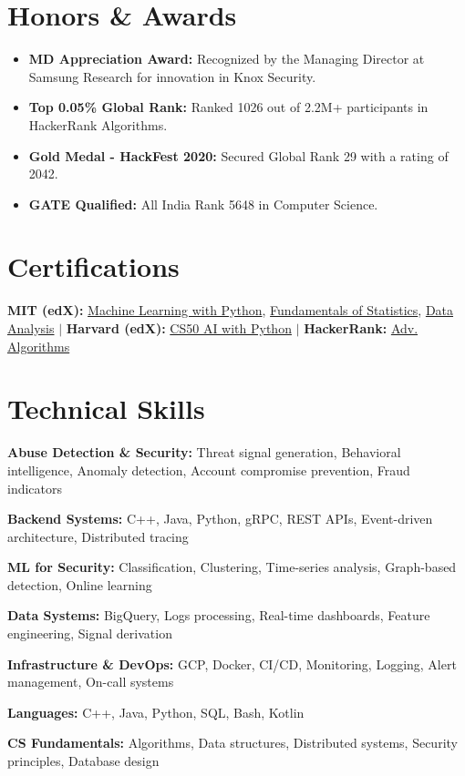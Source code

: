 \documentclass[10pt, letterpaper]{article}
\newcommand{\resumeItem}[1]{
  \item\small{
    {#1 \vspace{-2pt}}
  }
}
\newcommand{\resumeSubHeadingListStart}{\begin{itemize}[leftmargin=0.15in, label={}]}
\newcommand{\resumeSubHeadingListEnd}{\end{itemize}}
\begin{document}
\section{Honors \& Awards}
  \resumeSubHeadingListStart
    \resumeItem{\textbf{MD Appreciation Award:} Recognized by the Managing Director at Samsung Research for innovation in Knox Security.}
    \resumeItem{\textbf{Top 0.05\% Global Rank:} Ranked 1026 out of 2.2M+ participants in HackerRank Algorithms.}
    \resumeItem{\textbf{Gold Medal - HackFest 2020:} Secured Global Rank 29 with a rating of 2042.}
    \resumeItem{\textbf{GATE Qualified:} All India Rank 5648 in Computer Science.}
  \resumeSubHeadingListEnd

\section{Certifications}
  \small{
    \textbf{MIT (edX):} \href{https://courses.edx.org/certificates/bf4ea7cb34a742cea00c770801d1947d}{Machine Learning with Python}, \href{https://courses.edx.org/certificates/3c59035943454549990f2d2de7f49e9f}{Fundamentals of Statistics}, \href{https://courses.edx.org/certificates/bf4ea7cb34a742cea00c770801d1947d}{Data Analysis} $|$
    \textbf{Harvard (edX):} \href{https://cs50.harvard.edu/certificates/2b1773c1-473d-4a7b-89ae-460d23154126}{CS50 AI with Python} $|$
    \textbf{HackerRank:} \href{https://www.hackerrank.com/certificates/fc7b9af8aac8}{Adv. Algorithms}
  }

\section{Technical Skills}
 \begin{itemize}[leftmargin=0.12in, label={}]
    \small{\item{
     \textbf{Abuse Detection \& Security:} Threat signal generation, Behavioral intelligence, Anomaly detection, Account compromise prevention, Fraud indicators
    }}
    \small{\item{
     \textbf{Backend Systems:} C++, Java, Python, gRPC, REST APIs, Event-driven architecture, Distributed tracing
    }}
    \small{\item{
     \textbf{ML for Security:} Classification, Clustering, Time-series analysis, Graph-based detection, Online learning
    }}
    \small{\item{
     \textbf{Data Systems:} BigQuery, Logs processing, Real-time dashboards, Feature engineering, Signal derivation
    }}
    \small{\item{
     \textbf{Infrastructure \& DevOps:} GCP, Docker, CI/CD, Monitoring, Logging, Alert management, On-call systems
    }}
    \small{\item{
     \textbf{Languages:} C++, Java, Python, SQL, Bash, Kotlin
    }}
    \small{\item{
     \textbf{CS Fundamentals:} Algorithms, Data structures, Distributed systems, Security principles, Database design
    }}
 \end{itemize}
\end{document}

